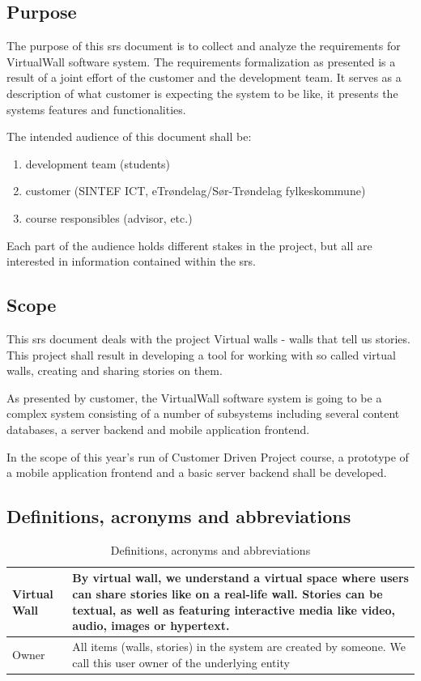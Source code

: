 \documentclass[11pt]{book}
\begin{document}
\subsection{Purpose}
The purpose of this \gls{srs} document is to collect and analyze the requirements for VirtualWall software system. The requirements formalization as presented is a result of a joint effort of the customer and the development team. It serves as a description of what customer is expecting the system to be like, it presents the systems features and functionalities.

The intended audience of this document shall be:

\begin{enumerate}
  \item development team (students)
  \item customer (SINTEF ICT, eTrøndelag/Sør-Trøndelag fylkeskommune)
  \item course responsibles (advisor, etc.)
\end{enumerate}

Each part of the audience holds different stakes in the project, but all are interested in information contained within the \gls{srs}.

\subsection{Scope}
This \gls{srs} document deals with the project Virtual walls - walls that tell us stories. This project shall result in developing a tool for working with so called virtual walls, creating and sharing stories on them.

As presented by customer, the VirtualWall software system is going to be a complex system consisting of a number of subsystems including several content databases, a server backend and mobile application frontend.

In the scope of this year's run of Customer Driven Project course, a prototype of a mobile application frontend and a basic server backend shall be developed.

\subsection{Definitions, acronyms and abbreviations}

\begin{table}[H]
\centering
\begin{tabular}{ l  p{11cm} }
    Virtual Wall     & By virtual wall, we understand a virtual space where users can share stories like on a real-life wall. 
                       Stories can be textual, as well as featuring interactive media like video, audio, images or hypertext.            \\ \hline
    Owner            & All items (walls, stories) in the system are created by someone. We call this user owner of the underlying entity \\
\end{tabular}
\label{tab:req_definitions}
\caption{Definitions, acronyms and abbreviations}
\end{table}
\end{document}
